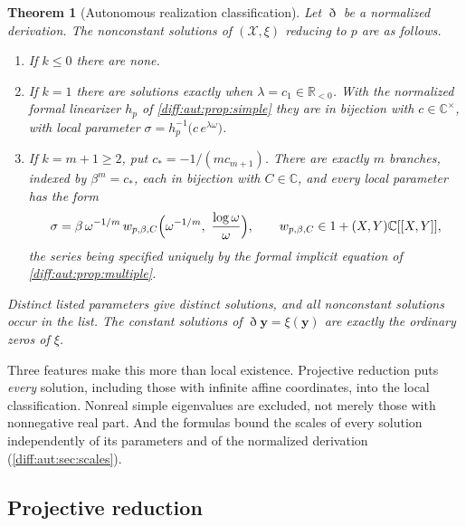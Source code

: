 \documentclass[11pt,letterpaper]{article}
\numberwithin{equation}{section}
\newtheorem{theorem}{Theorem}[section]
\theoremstyle{definition}
\theoremstyle{remark}
\newcommand{\R}{\mathbb R}
\newcommand{\C}{\mathbb C}
\newcommand{\Dn}{\eth}
\begin{document}
\begin{theorem}[Autonomous realization classification]
\label{diff:aut:thm:main}
Let $\Dn$ be a normalized derivation. The nonconstant solutions of
$(\mathcal X,\xi)$ reducing to $p$ are as follows.
\begin{enumerate}[label=\textup{(\roman*)},leftmargin=2.4em]
\item If $k\leq0$ there are none.
\item If $k=1$ there are solutions exactly when $\lambda=c_{1}\in\R_{<0}$. With
the normalized formal linearizer $h_{p}$ of \cref{diff:aut:prop:simple} they are
in bijection with $c\in\C^{\times}$, with local parameter
$\sigma=h_{p}^{-1}\bigl(c\,e^{\lambda\omega}\bigr)$.
\item If $k=m+1\geq2$, put $c_{\ast}=-1/(mc_{m+1})$. There are exactly $m$
branches, indexed by $\beta^{m}=c_{\ast}$, each in bijection with $C\in\C$, and
every local parameter has the form
\begin{equation}\label{diff:aut:eq:master}
 \sigma=\beta\,\omega^{-1/m}\,
 w_{p,\beta,C}\Bigl(\omega^{-1/m},\ \frac{\log\omega}{\omega}\Bigr),
 \qquad w_{p,\beta,C}\in1+(X,Y)\C[[X,Y]],
\end{equation}
the series being specified uniquely by the formal implicit equation of
\cref{diff:aut:prop:multiple}.
\end{enumerate}
Distinct listed parameters give distinct solutions, and all nonconstant
solutions occur in the list. The constant solutions of $\Dn\mathbf y=\xi(\mathbf y)$
are exactly the ordinary zeros of $\xi$.
\end{theorem}

Three features make this more than local existence. Projective reduction puts
\emph{every} solution, including those with infinite affine coordinates, into
the local classification. Nonreal simple eigenvalues are excluded, not merely
those with nonnegative real part. And the formulas bound the scales of every
solution independently of its parameters and of the normalized derivation
(\cref{diff:aut:sec:scales}).

\subsection{Projective reduction}
\label{diff:aut:sub:reduction}
\end{document}
